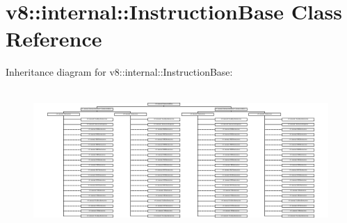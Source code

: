 \hypertarget{classv8_1_1internal_1_1InstructionBase}{}\section{v8\+:\+:internal\+:\+:Instruction\+Base Class Reference}
\label{classv8_1_1internal_1_1InstructionBase}
Inheritance diagram for v8\+:\+:internal\+:\+:Instruction\+Base\+:\begin{figure}[H]
\begin{center}
\leavevmode
\includegraphics[height=5.439189cm]{classv8_1_1internal_1_1InstructionBase}
\end{center}
\end{figure}
